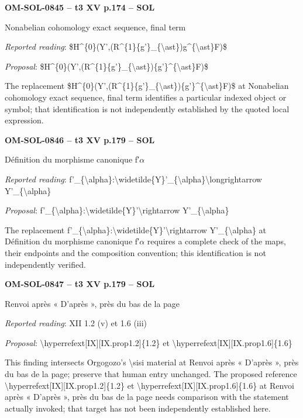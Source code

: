 \par\noindent\textbf{OM-SOL-0845 -- t3 XV p.174 -- SOL}\par
Nonabelian cohomology exact sequence, final term\par
\emph{Reported reading}: \$H\textasciicircum{}\{0\}(Y',(R\textasciicircum{}\{1\}\{g'\}\_\{\textbackslash{}ast\})g\textasciicircum{}\{\textbackslash{}ast\}F)\$\par
\emph{Proposal}: \$H\textasciicircum{}\{0\}(Y',(R\textasciicircum{}\{1\}\{g'\}\_\{\textbackslash{}ast\})\{g'\}\textasciicircum{}\{\textbackslash{}ast\}F)\$\par
The replacement \$H\textasciicircum{}\{0\}(Y',(R\textasciicircum{}\{1\}\{g'\}\_\{\textbackslash{}ast\})\{g'\}\textasciicircum{}\{\textbackslash{}ast\}F)\$ at Nonabelian cohomology exact sequence, final term identifies a particular indexed object or symbol; that identification is not independently established by the quoted local expression.\par
\par\noindent\textbf{OM-SOL-0846 -- t3 XV p.179 -- SOL}\par
Définition du morphisme canonique f′\ensuremath{\alpha}\par
\emph{Reported reading}: f'\_\{\textbackslash{}alpha\}:\textbackslash{}widetilde\{Y\}'\_\{\textbackslash{}alpha\}\textbackslash{}longrightarrow Y'\_\{\textbackslash{}alpha\}\par
\emph{Proposal}: f'\_\{\textbackslash{}alpha\}:\textbackslash{}widetilde\{Y\}'\textbackslash{}rightarrow Y'\_\{\textbackslash{}alpha\}\par
The replacement f'\_\{\textbackslash{}alpha\}:\textbackslash{}widetilde\{Y\}'\textbackslash{}rightarrow Y'\_\{\textbackslash{}alpha\} at Définition du morphisme canonique f′\ensuremath{\alpha} requires a complete check of the maps, their endpoints and the composition convention; this identification is not independently verified.\par
\par\noindent\textbf{OM-SOL-0847 -- t3 XV p.179 -- SOL}\par
Renvoi après « D'après », près du bas de la page\par
\emph{Reported reading}: XII 1.2 (v) et 1.6 (iii)\par
\emph{Proposal}: \textbackslash{}hyperrefext[IX][IX.prop1.2]\{1.2\} et \textbackslash{}hyperrefext[IX][IX.prop1.6]\{1.6\}\par
This finding intersects Orgogozo's \textbackslash{}sisi material at Renvoi après « D'après », près du bas de la page; preserve that human entry unchanged. The proposed reference \textbackslash{}hyperrefext[IX][IX.prop1.2]\{1.2\} et \textbackslash{}hyperrefext[IX][IX.prop1.6]\{1.6\} at Renvoi après « D'après », près du bas de la page needs comparison with the statement actually invoked; that target has not been independently established here.\par
